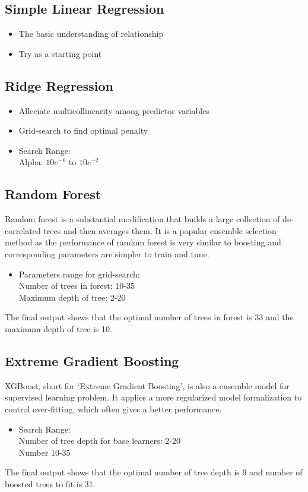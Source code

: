\documentclass[journal]{IEEEtran}
\begin{document}
\subsection{Simple Linear Regression}
\begin{itemize}
\item{The basic understanding of relationship}
\item{Try as a starting point}
\end{itemize}
\subsection{Ridge Regression}
\begin{itemize}
\item{Alleciate multicollinearity among predictor variables}
\item{Grid-search to find optimal penalty}
\item{Search Range:} \\
Alpha:     $10e^{-6}$ to $10e^{-2}$
\end{itemize}
\subsection{Random Forest}
Random forest is a substantial modification that builds a large collection of de-correlated trees and then averages them. It is a popular ensemble selection method as the performance of random forest is very similar to boosting and corresponding parameters are simpler to train and tune.
\begin{itemize}
\item{Parameters range for grid-search:} \\
Number of trees in forest: 10-35 \\
Maximum depth of tree: 2-20
\end{itemize}
The final output shows that the optimal number of trees in forest is 33 and the maximum depth of tree is 10.
\subsection{Extreme Gradient Boosting}
XGBoost, short for ‘Extreme Gradient Boosting’, is also a ensemble model for supervised learning problem. It applies a more regularized model formalization to control over-fitting, which often gives a better performance. 
\begin{itemize}
\item{Search Range:} \\
Number of tree depth for base learners: 2-20\\
Number 10-35
\end{itemize}
The final output shows that the optimal number of tree depth is 9 and number of boosted trees to fit is 31.
\end{document}
